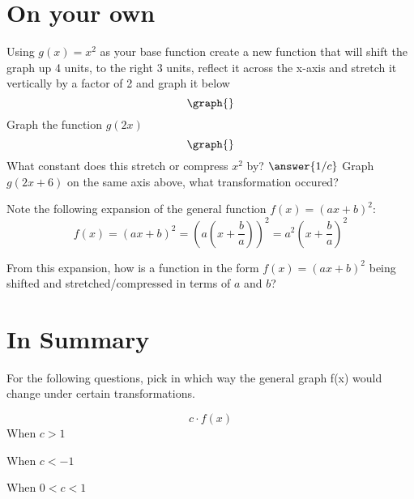 \documentclass{ximera}
\begin{document}
\section{On your own}
\begin{question}
Using $g(x) = x^2$ as your base function create a new function that will shift the graph up 4 units, to the right 3 units, reflect it across the x-axis and stretch it vertically by a factor of 2 and graph it below
\[
\graph{}
\]
Graph the function $g(2x)$
\[
\graph{}
\]
What constant does this stretch or compress $x^2$ by?
$\answer{1/c}$
Graph $g(2x+6)$ on the same axis above, what transformation occured?
\begin{freeResponse}
\end{freeResponse}
Note the following expansion of the general function $f(x)=(ax+b)^2$: $$\displaystyle f(x)=\left(ax+b\right)^2=\left(a\left(x+\frac{b}{a}\right)\right)^2=a^2\left(x+\frac{b}{a}\right)^2$$

From this expansion, how is a function in the form $f(x)=(ax+b)^2$ being shifted and stretched/compressed in terms of $a$ and $b$?
\begin{freeResponse}
\end{freeResponse}

\end{question}
\section{In Summary}

For the following questions, pick in which way the general graph f(x) would change under certain transformations.
\begin{question}
$$c \cdot f(x)$$
When $c>1$

\begin{multipleChoice}
\end{multipleChoice}

When $c<-1$

\begin{multipleChoice}
\end{multipleChoice}

When $0<c<1$

\begin{multipleChoice}
\end{multipleChoice}
\end{question}
\end{document}
